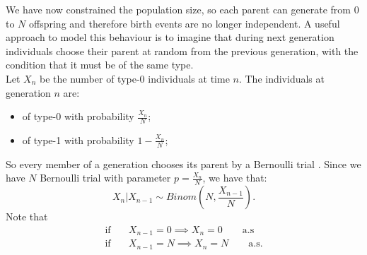 \documentclass{article}
\begin{document}
We have now constrained the population size, so each parent can generate from 0 to $N$ offspring and therefore birth events are no longer independent. A useful approach to model this behaviour is to imagine that during next generation individuals choose their parent at random from the previous generation, with the condition that it must be of the same type.\\
Let $X_n$ be the number of type-0 individuals at time $n$. The individuals at generation $n$ are:
\begin{itemize}
    \item of type-0 with probability $\frac{X_n}{N}$;
    \item of type-1 with probability $1-\frac{X_n}{N}$;
\end{itemize}
So every member of a generation chooses its parent by a Bernoulli trial . Since we have $N$ Bernoulli trial with parameter $p=\frac{X_n}{N}$, we have that:
\[
X_n|X_{n-1}\sim Binom(N,\frac{X_{n-1}}{N}).
\]
Note that 
\begin{align*}
    \text{if}\quad &X_{n-1}=0 \implies X_n=0\qquad\text{a.s}\\
    \text{if}\quad &X_{n-1}=N \implies X_n=N\qquad\text{a.s}.
\end{align*}
\end{document}
